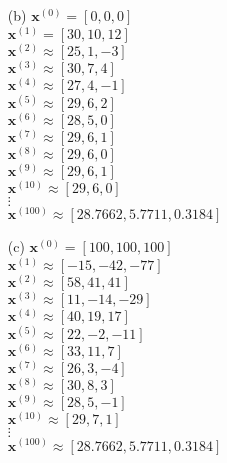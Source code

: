 \documentclass[letterpaper,fleqn,leqno]{article}
\begin{document}
{{\begin{enumerate}
				\item [(b)]
				$\textbf{x}^{(0)}=[0,0,0]$ \\
				$\textbf{x}^{(1)}=[30,10,12]$ \\
				$\textbf{x}^{(2)}\approx[25,1,-3]$ \\
				$\textbf{x}^{(3)}\approx[30,7,4]$ \\
				$\textbf{x}^{(4)}\approx[27,4,-1]$ \\
				$\textbf{x}^{(5)}\approx[29,6,2]$ \\
				$\textbf{x}^{(6)}\approx[28,5,0]$ \\
				$\textbf{x}^{(7)}\approx[29,6,1]$ \\
				$\textbf{x}^{(8)}\approx[29,6,0]$ \\
				$\textbf{x}^{(9)}\approx[29,6,1]$ \\
				$\textbf{x}^{(10)}\approx[29,6,0]$ \\
				$\vdots$ \\
				$\textbf{x}^{(100)}\approx[28.7662,5.7711,0.3184]$ \\

				\item [(c)]
				$\textbf{x}^{(0)}=[100,100,100]$ \\
				$\textbf{x}^{(1)}\approx[-15,-42,-77]$ \\
				$\textbf{x}^{(2)}\approx[58,41,41]$ \\
				$\textbf{x}^{(3)}\approx[11,-14,-29]$ \\
				$\textbf{x}^{(4)}\approx[40,19,17]$ \\
				$\textbf{x}^{(5)}\approx[22,-2,-11]$ \\
				$\textbf{x}^{(6)}\approx[33,11,7]$ \\
				$\textbf{x}^{(7)}\approx[26,3,-4]$ \\
				$\textbf{x}^{(8)}\approx[30,8,3]$ \\
				$\textbf{x}^{(9)}\approx[28,5,-1]$ \\
				$\textbf{x}^{(10)}\approx[29,7,1]$ \\
				$\vdots$ \\
				$\textbf{x}^{(100)}\approx[28.7662,5.7711,0.3184]$ \\
			\end{enumerate}
		}
	}
\end{document}
